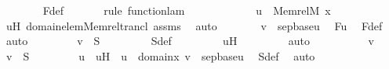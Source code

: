 \begin{isabellebody}
\ \ \ \ \ \ \isamarkupfalse%
\ F{\isacharunderscore}{\kern0pt}def\isanewline
\ \ \ \ \ \ \isamarkupfalse%
{\isacharparenleft}{\kern0pt}rule\ function{\isacharunderscore}{\kern0pt}lam{\isacharparenright}{\kern0pt}\isanewline
\ \ \ \ \ \ \isamarkupfalse%
\isanewline
\ \ \ \ \isamarkupfalse%
\ {\isachardoublequoteopen}u\ {\isasymin}\ Memrel{\isacharparenleft}{\kern0pt}M{\isacharparenright}{\kern0pt}{\isacharcircum}{\kern0pt}{\isacharplus}{\kern0pt}\ {\isacharminus}{\kern0pt}{\isacharbackquote}{\kern0pt}{\isacharbackquote}{\kern0pt}{\isacharbraceleft}{\kern0pt}x{\isacharbraceright}{\kern0pt}{\isachardoublequoteclose}\ \isamarkupfalse%
\ uH\ domain{\isacharunderscore}{\kern0pt}elem{\isacharunderscore}{\kern0pt}Memrel{\isacharunderscore}{\kern0pt}trancl\ assms\ \isamarkupfalse%
\ auto\isanewline
\ \ \ \ \isamarkupfalse%
\ \isamarkupfalse%
\ {\isachardoublequoteopen}v\ {\isacharequal}{\kern0pt}\ sep{\isacharunderscore}{\kern0pt}base{\isacharparenleft}{\kern0pt}u{\isacharparenright}{\kern0pt}{\isachardoublequoteclose}\ \isamarkupfalse%
\ Fu\ \isamarkupfalse%
\ F{\isacharunderscore}{\kern0pt}def\ \isamarkupfalse%
\ auto\ \isanewline
\ \ \ \ \isamarkupfalse%
\ \isamarkupfalse%
\ {\isachardoublequoteopen}v\ {\isasymin}\ S{\isachardoublequoteclose}\ \isanewline
\ \ \ \ \ \ \isamarkupfalse%
\ S{\isacharunderscore}{\kern0pt}def\ \isanewline
\ \ \ \ \ \ \isamarkupfalse%
\ uH\ \isanewline
\ \ \ \ \ \ \isamarkupfalse%
\ auto\isanewline
\ \ \isamarkupfalse%
\ \isanewline
\ \ \ \ \isamarkupfalse%
\ v\ \isamarkupfalse%
\ {\isachardoublequoteopen}v\ {\isasymin}\ S{\isachardoublequoteclose}\ \isanewline
\ \ \ \ \isamarkupfalse%
\ \isamarkupfalse%
\ u\ \ uH\ {\isacharcolon}{\kern0pt}\ {\isachardoublequoteopen}u\ {\isasymin}\ domain{\isacharparenleft}{\kern0pt}x{\isacharparenright}{\kern0pt}{\isachardoublequoteclose}\ {\isachardoublequoteopen}v\ {\isacharequal}{\kern0pt}\ sep{\isacharunderscore}{\kern0pt}base{\isacharparenleft}{\kern0pt}u{\isacharparenright}{\kern0pt}{\isachardoublequoteclose}\ \isamarkupfalse%
\ S{\isacharunderscore}{\kern0pt}def\ \isamarkupfalse%
\ auto\ \isanewline
\ \ \ \ \isamarkupfalse%
\ \isamarkupfalse%

\end{isabellebody}
